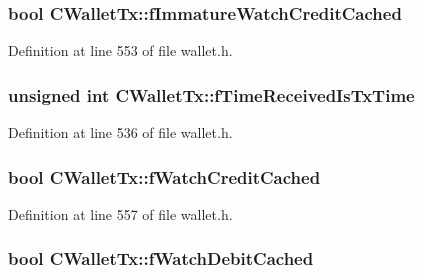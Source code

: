 \subsubsection[{f\+Immature\+Watch\+Credit\+Cached}]{\setlength{\rightskip}{0pt plus 5cm}bool C\+Wallet\+Tx\+::f\+Immature\+Watch\+Credit\+Cached\hspace{0.3cm}{\ttfamily [mutable]}}\label{class_c_wallet_tx_a15c52b4c9a7ee5e87f86324c7e08fe96}


Definition at line 553 of file wallet.\+h.

\hypertarget{class_c_wallet_tx_ac058c61be3a1c680a3ad384ff04d27eb}{}
\subsubsection[{f\+Time\+Received\+Is\+Tx\+Time}]{\setlength{\rightskip}{0pt plus 5cm}unsigned int C\+Wallet\+Tx\+::f\+Time\+Received\+Is\+Tx\+Time}\label{class_c_wallet_tx_ac058c61be3a1c680a3ad384ff04d27eb}


Definition at line 536 of file wallet.\+h.

\hypertarget{class_c_wallet_tx_abbe2fa89b594fd1c931572bdf7b7a4cd}{}
\subsubsection[{f\+Watch\+Credit\+Cached}]{\setlength{\rightskip}{0pt plus 5cm}bool C\+Wallet\+Tx\+::f\+Watch\+Credit\+Cached\hspace{0.3cm}{\ttfamily [mutable]}}\label{class_c_wallet_tx_abbe2fa89b594fd1c931572bdf7b7a4cd}


Definition at line 557 of file wallet.\+h.

\hypertarget{class_c_wallet_tx_a803d33ac2e13c964a2778bd575f5c69c}{}
\subsubsection[{f\+Watch\+Debit\+Cached}]{\setlength{\rightskip}{0pt plus 5cm}bool C\+Wallet\+Tx\+::f\+Watch\+Debit\+Cached\hspace{0.3cm}{\ttfamily [mutable]}}\label{class_c_wallet_tx_a803d33ac2e13c964a2778bd575f5c69c}


